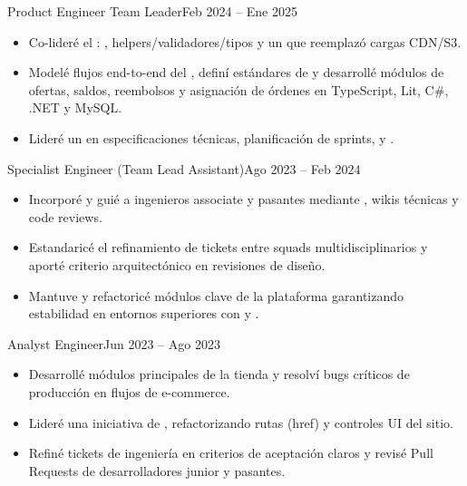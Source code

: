 \begin{TimelineRole}{Product Engineer Team Leader}{Feb 2024 – Ene 2025}
    \begin{itemize}
        \item Co-lideré el : , helpers/validadores/tipos y un  que reemplazó cargas CDN/S3.
        \item Modelé flujos end-to-end del , definí estándares de  y desarrollé módulos de ofertas, saldos, reembolsos y asignación de órdenes en TypeScript, Lit, C\#, .NET y MySQL.
        \item Lideré un  en especificaciones técnicas, planificación de sprints,  y .
    \end{itemize}
\end{TimelineRole}

\begin{TimelineRole}[last]{Specialist Engineer (Team Lead Assistant)}{Ago 2023 – Feb 2024}
    \begin{itemize}
        \item Incorporé y guié a ingenieros associate y pasantes mediante , wikis técnicas y code reviews.
        \item Estandaricé el refinamiento de tickets entre squads multidisciplinarios y aporté criterio arquitectónico en revisiones de diseño.
        \item Mantuve y refactoricé módulos clave de la plataforma garantizando estabilidad en entornos superiores con  y .
    \end{itemize}
\end{TimelineRole}

\newpage
{}

\begin{TimelineRole}[last]{Analyst Engineer}{Jun 2023 – Ago 2023}
    \begin{itemize}
        \item Desarrollé módulos principales de la tienda y resolví bugs críticos de producción en flujos de e-commerce.
        \item Lideré una iniciativa de , refactorizando rutas (href) y controles UI del sitio.
        \item Refiné tickets de ingeniería en criterios de aceptación claros y revisé Pull Requests de desarrolladores junior y pasantes.
    \end{itemize}
\end{TimelineRole}


